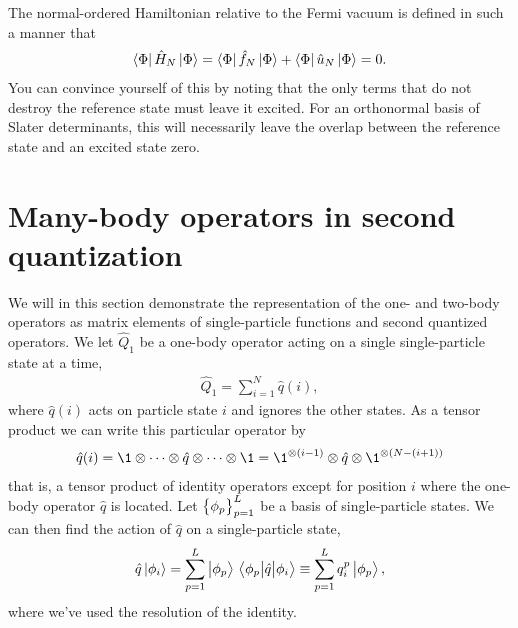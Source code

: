         The normal-ordered Hamiltonian relative to the Fermi vacuum is defined
        in such a manner that
        \begin{align}
            \bra{\Phi}\hat{H}_N\ket{\Phi}
            = \bra{\Phi}\hat{f}_N\ket{\Phi}
            + \bra{\Phi}\hat{u}_N\ket{\Phi}
            = 0.
        \end{align}
        You can convince yourself of this by noting that the only terms that
        do not destroy the reference state must leave it excited.
        For an orthonormal basis of Slater determinants, this will necessarily
        leave the overlap between the reference state and an excited state zero.

    \section{Many-body operators in second quantization}
        \label{app:operator-representation}
        We will in this section demonstrate the representation of the one- and
        two-body operators as matrix elements of single-particle functions and
        second quantized operators.
        We let $\hat{Q}_1$ be a one-body operator acting on a single
        single-particle state at a time,
        \begin{align}
            \hat{Q}_1
            = \sum_{i = 1}^{N}\hat{q}(i),
        \end{align}
        where $\hat{q}(i)$ acts on particle state $i$ and ignores the other
        states.
        As a tensor product we can write this particular operator by
        \begin{align}
            \hat{q}(i)
            = \1\otimes
            \dots\otimes\hat{q}\otimes\dots\otimes\1
            = \1^{\otimes (i - 1)}
            \otimes\hat{q}
            \otimes\1^{\otimes (N - (i + 1))}
        \end{align}
        that is, a tensor product of identity operators except for position $i$
        where the one-body operator $\hat{q}$ is located.
        Let $\left\{ \phi_p \right\}_{p = 1}^{L}$ be a basis of single-particle states.
        We can then find the action of $\hat{q}$ on a single-particle state,
        \begin{align}
            \hat{q}\ket{\phi_i}
            = \sum_{p = 1}^{L}\ket{\phi_{p}}\mel{\phi_p}{\hat{q}}{\phi_i}
            \equiv \sum_{p = 1}^{L} q^{p}_{i}\ket{\phi_p},
        \end{align}
        where we've used the resolution of the identity.
